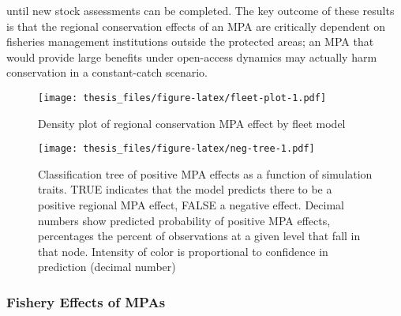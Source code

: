 \documentclass[twoside,12pt,final]{ucthesis-CA2012}
\begin{document}
\begin{ucmainmatter}
until new stock assessments can be completed. The key outcome of these
results is that the regional conservation effects of an MPA are
critically dependent on fisheries management institutions outside the
protected areas; an MPA that would provide large benefits under
open-access dynamics may actually harm conservation in a constant-catch
scenario.
\begin{figure}
\centering
\texttt{[image: thesis\_files/figure-latex/fleet-plot-1.pdf]}
\caption{\label{fig:fleet-plot}Density plot of regional conservation MPA
effect by fleet model}
\end{figure}
\begin{figure}
\centering
\texttt{[image: thesis\_files/figure-latex/neg-tree-1.pdf]}
\caption{\label{fig:neg-tree}Classification tree of positive MPA effects as
a function of simulation traits. TRUE indicates that the model predicts
there to be a positive regional MPA effect, FALSE a negative effect.
Decimal numbers show predicted probability of positive MPA effects,
percentages the percent of observations at a given level that fall in
that node. Intensity of color is proportional to confidence in
prediction (decimal number)}
\end{figure}
\subsubsection{Fishery Effects of MPAs}\label{fishery-effects-of-mpas}


\end{ucmainmatter}
\end{document}
